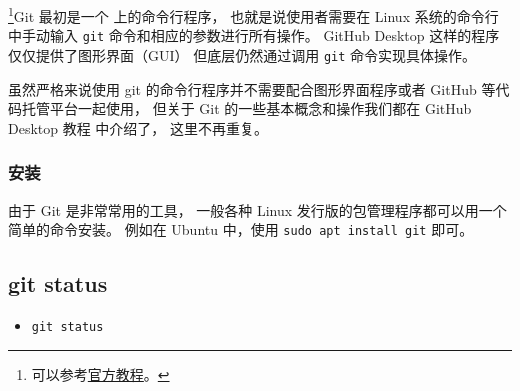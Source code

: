 
\begin{issues}
\issueDraft
\end{issues}


\footnote{可以参考\href{https://git-scm.com/book/en/v2}{官方教程}。}Git 最初是一个  上的命令行程序， 也就是说使用者需要在 Linux 系统的命令行中手动输入 \verb|git| 命令和相应的参数进行所有操作。 GitHub Desktop 这样的程序仅仅提供了图形界面（GUI） 但底层仍然通过调用 \verb|git| 命令实现具体操作。

虽然严格来说使用 git 的命令行程序并不需要配合图形界面程序或者 GitHub 等代码托管平台一起使用， 但关于 Git 的一些基本概念和操作我们都在 GitHub Desktop 教程 中介绍了， 这里不再重复。

\subsubsection{安装}
由于 Git 是非常常用的工具， 一般各种 Linux 发行版的包管理程序都可以用一个简单的命令安装。 例如在 Ubuntu 中，使用 \verb|sudo apt install git| 即可。

\subsection{git status}
\begin{itemize}
\item \verb|git status|
\end{itemize}
